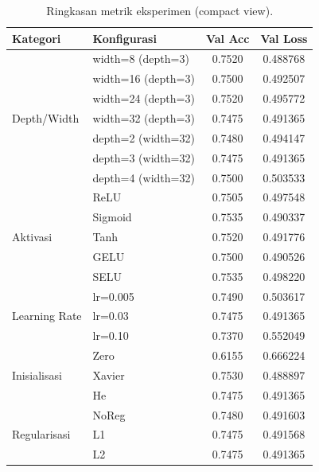 \documentclass{article}
\begin{document}
\begin{table}[!tbp]
\begin{center}
\small
\setlength{\tabcolsep}{4pt}
\caption{Ringkasan metrik eksperimen (compact view).}
\label{tab:compact_summary}
\begin{tabular}{llcc}
\toprule
\textbf{Kategori} & \textbf{Konfigurasi} & \textbf{Val Acc} & \textbf{Val Loss} \\
\midrule
\multirow{7}{*}{Depth/Width} & width=8 (depth=3) & 0.7520 & 0.488768 \\
 & width=16 (depth=3) & 0.7500 & 0.492507 \\
 & width=24 (depth=3) & 0.7520 & 0.495772 \\
 & width=32 (depth=3) & 0.7475 & 0.491365 \\
 & depth=2 (width=32) & 0.7480 & 0.494147 \\
 & depth=3 (width=32) & 0.7475 & 0.491365 \\
 & depth=4 (width=32) & 0.7500 & 0.503533 \\
\multirow{5}{*}{Aktivasi} & ReLU & 0.7505 & 0.497548 \\
 & Sigmoid & 0.7535 & 0.490337 \\
 & Tanh & 0.7520 & 0.491776 \\
 & GELU & 0.7500 & 0.490526 \\
 & SELU & 0.7535 & 0.498220 \\
\multirow{3}{*}{Learning Rate} & lr=0.005 & 0.7490 & 0.503617 \\
 & lr=0.03 & 0.7475 & 0.491365 \\
 & lr=0.10 & 0.7370 & 0.552049 \\
\multirow{3}{*}{Inisialisasi} & Zero & 0.6155 & 0.666224 \\
 & Xavier & 0.7530 & 0.488897 \\
 & He & 0.7475 & 0.491365 \\
\multirow{3}{*}{Regularisasi} & NoReg & 0.7480 & 0.491603 \\
 & L1 & 0.7475 & 0.491568 \\
 & L2 & 0.7475 & 0.491365 \\
\bottomrule
\end{tabular}
\end{center}
\end{table}
\end{document}
